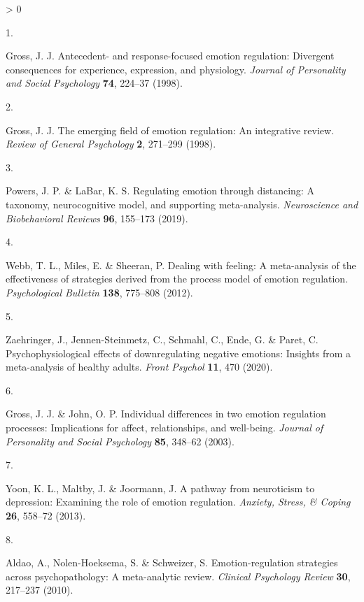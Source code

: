 \documentclass[
  english,
  man,floatsintext]{apa6}
\newlength{\cslhangindent}
\newlength{\csllabelwidth}
\newenvironment{CSLReferences}[2] %
 {%
  \setlength{\parindent}{0pt}
  \ifodd #1 \everypar{\setlength{\hangindent}{\cslhangindent}}\ignorespaces\fi
  \ifnum #2 > 0
  \setlength{\parskip}{#2\baselineskip}
  \fi
 }%
 {}
\newcommand{\CSLLeftMargin}[1]{\parbox[t]{\csllabelwidth}{#1}}
\newcommand{\CSLRightInline}[1]{\parbox[t]{\linewidth - \csllabelwidth}{#1}\break}
\begin{document}
\hypertarget{refs}{}
\begin{CSLReferences}{0}{0}
\leavevmode\hypertarget{ref-Gross1998antecedent}{}%
\CSLLeftMargin{1. }
\CSLRightInline{Gross, J. J. Antecedent- and response-focused emotion regulation: Divergent consequences for experience, expression, and physiology. \emph{Journal of Personality and Social Psychology} \textbf{74}, 224--37 (1998).}

\leavevmode\hypertarget{ref-Gross1998emerging}{}%
\CSLLeftMargin{2. }
\CSLRightInline{Gross, J. J. The emerging field of emotion regulation: An integrative review. \emph{Review of General Psychology} \textbf{2}, 271--299 (1998).}

\leavevmode\hypertarget{ref-Powers2019}{}%
\CSLLeftMargin{3. }
\CSLRightInline{Powers, J. P. \& LaBar, K. S. Regulating emotion through distancing: A taxonomy, neurocognitive model, and supporting meta-analysis. \emph{Neuroscience and Biobehavioral Reviews} \textbf{96}, 155--173 (2019).}

\leavevmode\hypertarget{ref-Webb2012}{}%
\CSLLeftMargin{4. }
\CSLRightInline{Webb, T. L., Miles, E. \& Sheeran, P. Dealing with feeling: A meta-analysis of the effectiveness of strategies derived from the process model of emotion regulation. \emph{Psychological Bulletin} \textbf{138}, 775--808 (2012).}

\leavevmode\hypertarget{ref-Zaehringer2020}{}%
\CSLLeftMargin{5. }
\CSLRightInline{Zaehringer, J., Jennen-Steinmetz, C., Schmahl, C., Ende, G. \& Paret, C. Psychophysiological effects of downregulating negative emotions: Insights from a meta-analysis of healthy adults. \emph{Front Psychol} \textbf{11}, 470 (2020).}

\leavevmode\hypertarget{ref-GrossJohn2003}{}%
\CSLLeftMargin{6. }
\CSLRightInline{Gross, J. J. \& John, O. P. Individual differences in two emotion regulation processes: Implications for affect, relationships, and well-being. \emph{Journal of Personality and Social Psychology} \textbf{85}, 348--62 (2003).}

\leavevmode\hypertarget{ref-Yoon2013}{}%
\CSLLeftMargin{7. }
\CSLRightInline{Yoon, K. L., Maltby, J. \& Joormann, J. A pathway from neuroticism to depression: Examining the role of emotion regulation. \emph{Anxiety, Stress, \& Coping} \textbf{26}, 558--72 (2013).}

\leavevmode\hypertarget{ref-Aldao2010}{}%
\CSLLeftMargin{8. }
\CSLRightInline{Aldao, A., Nolen-Hoeksema, S. \& Schweizer, S. Emotion-regulation strategies across psychopathology: A meta-analytic review. \emph{Clinical Psychology Review} \textbf{30}, 217--237 (2010).}


\end{CSLReferences}
\end{document}
